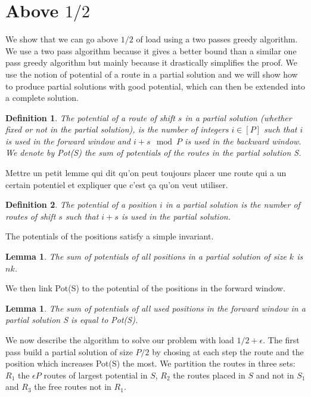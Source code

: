 \documentclass[10pt, conference, letterpaper]{IEEEtran}
\newtheorem{lemma}[theorem]{Lemma}
\newtheorem{definition}{Definition}
\begin{document}
\section{Above $1/2$}
We show that we can go above $1/2$ of load using a two passes greedy algorithm.
We use a two pass algorithm because it gives a better bound than a similar one pass
greedy algorithm but mainly because it drastically simplifies the proof.
We use the notion of potential of a route in a partial solution and we will show how
to produce partial solutions with good potential, which can then be extended into a complete solution.

\begin{definition}
The potential of a route of shift $s$ in a partial solution (whether fixed or not in the partial solution),
is the number of integers $i \in [P]$ such that $i$ is used in the forward window and $i+s \mod P$ is used in the backward window. We denote by Pot(S) the sum of potentials of the routes in the partial solution S.
\end{definition} 

Mettre un petit lemme qui dit qu'on peut toujours placer une route qui a un certain
potentiel et expliquer que c'est ça qu'on veut utiliser.


\begin{definition}
The potential of a position $i$ in a partial solution is the number of routes of shift $s$ such that $i+s$ is used in the partial solution. 
\end{definition}

The potentials of the positions satisfy a simple invariant.
\begin{lemma}\label{lemma:inv}
The sum of potentials of all positions in a partial solution of size $k$ is $nk$.  
\end{lemma}

We then link Pot(S) to the potential of the positions in the forward window.
\begin{lemma}\label{lemma:pot_pos}
The sum of potentials of all used positions in the forward window in a partial solution S is equal 
to Pot(S).  
\end{lemma}
 

We now describe the algorithm to solve our problem with load $1/2 + \epsilon$. The first pass build a partial solution of size $P/2$ by chosing at each step the route and the position which increases Pot(S) the most.
We partition the routes in three sets: $R_1$ the $\epsilon P$ routes of largest potential in $S$, $R_2$ the
routes placed in $S$ and not in $S_1$ and $R_3$ the free routes not in $R_1$. 
\end{document}
